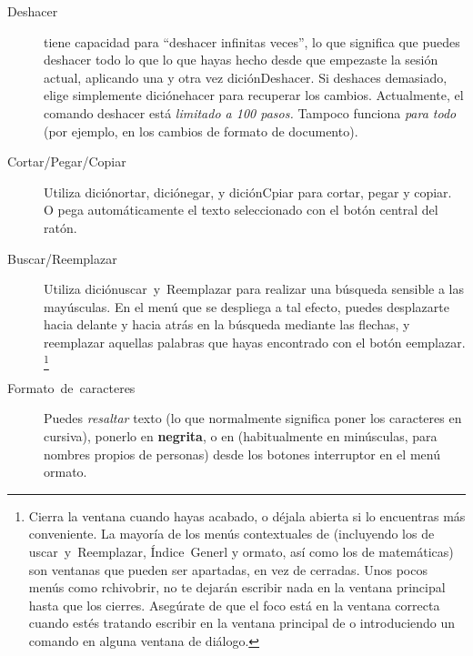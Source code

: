 \begin{description}
\item [Deshacer]\LyX{} tiene capacidad para {}``deshacer infinitas veces'',
lo que significa que puedes deshacer todo lo que lo que hayas hecho
desde que empezaste la sesión actual, aplicando una y otra vez \textsf{}\textsf{dición\lyxarrow{}Deshacer}.
Si deshaces demasiado, elige simplemente \textsf{}\textsf{dición\lyxarrow{}}\textsf{}\textsf{ehacer}
para recuperar los cambios. Actualmente, el comando deshacer está
\emph{limitado a 100 pasos.} Tampoco funciona \emph{para todo} (por
ejemplo, en los cambios de formato de documento).
\item [Cortar/Pegar/Copiar]Utiliza \textsf{}\textsf{dición\lyxarrow{}}\textsf{}\textsf{ortar},
\textsf{}\textsf{dición\lyxarrow{}}\textsf{}\textsf{egar},
y \textsf{}\textsf{dición\lyxarrow{}C}\textsf{}\textsf{piar}
para cortar, pegar y copiar. O pega automáticamente el texto seleccionado
con el botón central del ratón.
\item [Buscar/Reemplazar]Utiliza \textsf{}\textsf{dición\lyxarrow{}}\textsf{}\textsf{uscar~y~Reemplazar}
para realizar una búsqueda sensible a las mayúsculas. En el menú que
se despliega a tal efecto, puedes desplazarte hacia delante y hacia
atrás en la búsqueda mediante las flechas, y reemplazar aquellas palabras
que hayas encontrado con el botón \textsf{}\textsf{eemplazar}.%
\footnote{Cierra la ventana cuando hayas acabado, o déjala abierta si lo encuentras
más conveniente. La mayoría de los menús contextuales de \LyX{} (incluyendo
los de \textsf{}\textsf{uscar~y~Reemplazar, Índice~Gener}\textsf{}\textsf{l}
y \textsf{}ormato, así como los de matemáticas) son ventanas
que pueden ser apartadas, en vez de cerradas. Unos pocos menús como
\textsf{}\textsf{rchivo\lyxarrow{}}\textsf{}\textsf{brir},
no te dejarán escribir nada en la ventana principal hasta que los
cierres. Asegúrate de que el foco está en la ventana correcta cuando
estés tratando escribir en la ventana principal de \LyX{} o introduciendo
un comando en alguna ventana de diálogo.%
}
\item [Formato~de~caracteres]Puedes \emph{resaltar} texto (lo que normalmente
significa poner los caracteres en cursiva), ponerlo en \textbf{negrita},
o en  (habitualmente en minúsculas, para nombres
propios de personas) desde los botones interruptor en el menú \textsf{}\textsf{ormato}.

\end{description}
